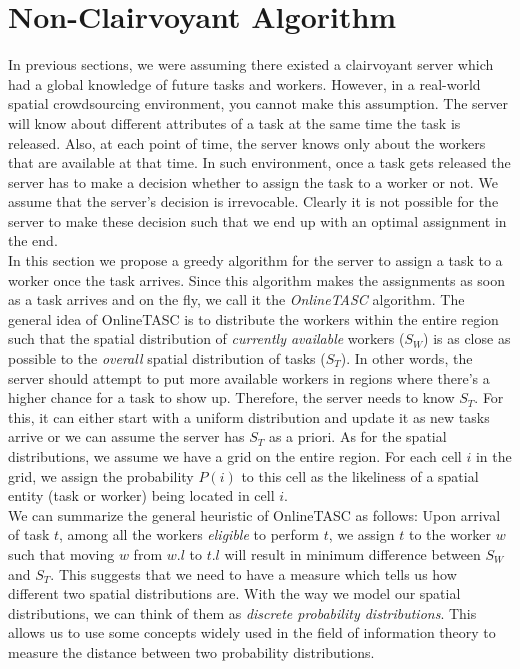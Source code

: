 \section{Non-Clairvoyant Algorithm}

In previous sections, we were assuming there existed a clairvoyant server which had a global knowledge of future tasks and workers. However, in a real-world spatial crowdsourcing environment, you cannot make this assumption. The server will know about different attributes of a task at the same time the task is released. Also, at each point of time, the server knows only about the workers that are available at that time. In such environment, once a task gets released the server has to make a decision whether to assign the task to a worker or not. We assume that the server's decision is irrevocable. Clearly it is not possible for the server to make these decision such that we end up with an optimal assignment in the end.\\

In this section we propose a greedy algorithm for the server to assign a task to a worker once the task arrives. Since this algorithm makes the assignments as soon as a task arrives and on the fly, we call it the \emph{OnlineTASC} algorithm. The general idea of OnlineTASC is to distribute the workers within the entire region such that the spatial distribution of \emph{currently available} workers ($S_W$) is as close as possible to the \emph{overall} spatial distribution of tasks ($S_T$). In other words, the server should attempt to put more available workers in regions where there's a higher chance for a task to show up. Therefore, the server needs to know $S_T$. For this, it can either start with a uniform distribution and update it as new tasks arrive or we can assume the server has $S_T$ as a priori. As for the spatial distributions, we assume we have a grid on the entire region. For each cell $i$ in the grid, we assign the probability $P(i)$ to this cell as the likeliness of a spatial entity (task or worker) being located in cell $i$.\\

We can summarize the general heuristic of OnlineTASC as follows: Upon arrival of task $t$, among all the workers \emph{eligible} to perform $t$, we assign $t$ to the worker $w$ such that moving $w$ from $w.l$ to $t.l$ will result in minimum difference between $S_W$ and $S_T$. This suggests that we need to have a measure which tells us how different two spatial distributions are. With the way we model our spatial distributions, we can think of them as \emph{discrete probability distributions}. This allows us to use some concepts widely used in the field of information theory to measure the distance between two probability distributions.

